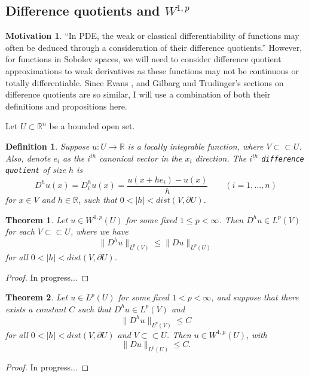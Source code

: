 \documentclass[11pt]{article}
\newtheorem{theorem}{Theorem}
\newtheorem{definition}{Definition}
\theoremstyle{definition}
\newtheorem*{motivation}{Motivation}
\begin{document}
\subsection{Difference quotients and $W^{1,p}$}
\begin{motivation}
	``In PDE, the weak or classical differentiability of functions may often be deduced through a consideration of their difference quotients.''
	\cite{gilbarg2001elliptic} However, for functions in Sobolev spaces, we will need to consider difference quotient approximations to
	weak derivatives as these functions may not be continuous or totally differentiable. Since Evans \cite{evans1998partial}, and
	Gilbarg and Trudinger's \cite{gilbarg2001elliptic} sections on difference quotients are so similar, I will use a combination of
	both their definitions and propositions here.
\end{motivation}
Let $U \subset \mathbb{R}^n$ be a bounded open set.
\begin{definition}
	Suppose $u : U \rightarrow \mathbb{R}$ is a locally integrable function, where $V \subset\subset U$.
	Also, denote $e_i$ as the $i^{th}$ canonical vector in the $x_i$ direction.
	The $i^{th}$ \texttt{difference quotient} of size $h$ is
	\begin{equation*}
		D^hu(x) = D_i^hu(x) = \frac{u(x + he_i) - u(x)}{h} \qquad (i = 1,\dots,n)
	\end{equation*}
	for $x \in V$ and $h \in \mathbb{R}$, such that $0 < |h| < dist(V,\partial U)$.
\end{definition}

\begin{theorem}
	Let $u \in W^{1,p}(U)$ for some fixed $1 \leq p < \infty$. Then $D^hu \in L^p(V)$ for each $V \subset\subset U$, where we have
	\begin{equation*}
		\|D^hu\|_{L^p(V)} \leq \|Du\|_{L^p(U)}
	\end{equation*}
	for all $0 < |h| < dist(V,\partial U)$.
\end{theorem}
\begin{proof}
	In progress...
\end{proof}

\begin{theorem}
	Let $u \in L^p(U)$ for some fixed $1 < p < \infty$, and suppose that there exists a constant $C$ such that
	$D^hu \in L^p(V)$ and 
	\begin{equation*}
		\|D^hu\|_{L^p(V)} \leq C
	\end{equation*}
	for all $0 < |h| < dist(V,\partial U)$ and $V \subset\subset U$.
	Then $u \in W^{1,p}(U)$, with
	\begin{equation*}
		\|Du\|_{L^p(U)} \leq C.
	\end{equation*}
\end{theorem}
\begin{proof}
	In progress...
\end{proof}
\end{document}
